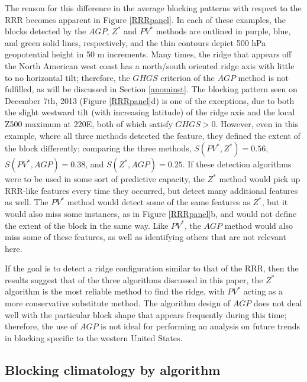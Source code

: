 \documentclass[smallextended]{svjour3}       %
\numberwithin{equation}{section}
\begin{document}
The reason for this difference in the average blocking patterns with respect to the RRR becomes apparent in Figure \ref{RRRpanel}. In each of these examples, the blocks detected by the $AGP$, $Z^*$ and $PV^*$ methods are outlined in purple, blue, and green solid lines, respectively, and the thin contours depict 500 hPa geopotential height in 50 m increments. Many times, the ridge that appears off the North American west coast has a north/south oriented ridge axis with little to no horizontal tilt; therefore, the $GHGS$ criterion of the $AGP$ method is not fulfilled, as will be discussed in Section \ref{anominst}. The blocking pattern seen on December 7th, 2013 (Figure \ref{RRRpanel}d) is one of the exceptions, due to both the slight westward tilt (with increasing latitude) of  the ridge axis and the local Z500 maximum at 220E, both of which satisfy $GHGS>0$. However, even in this example, where all three methods detected the feature, they defined the extent of the block differently; comparing the three methods, $S(PV^*,Z^*)=0.56$, $S(PV^*,AGP)=0.38$, and $S(Z^*,AGP)=0.25$. If these detection algorithms were to be used in some sort of predictive capacity, the $Z^*$ method would pick up RRR-like features every time they occurred, but detect many additional features as well. The $PV^*$ method would detect some of the same features as $Z^*$, but it would also miss some instances, as in Figure \ref{RRRpanel}b, and would not define the extent of the block in the same way. Like $PV^*$, the $AGP$ method would also miss some of these features, as well as identifying others that are not relevant here. 

If the goal is to detect a ridge configuration similar to that of the RRR, then the results suggest that of the three algorithms discussed in this paper, the $Z^*$ algorithm is the most reliable method to find the ridge, with $PV^*$ acting as a more conservative substitute method. The algorithm design of $AGP$ does not deal well with the particular block shape that appears frequently during this time; therefore, the use of $AGP$ is not ideal for performing an analysis on future trends in blocking specific to the western United States. 


\subsection{Blocking climatology by algorithm}\label{blockingclim}
\end{document}
